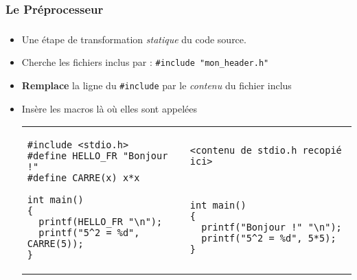\subsubsection{Le Préprocesseur}
\begin{frame}[fragile]
\frametitle{\insertsubsubsection}
\begin{itemize}
  \item Une étape de transformation \textit{statique} du code source.
  \item Cherche les fichiers inclus par : \texttt{\#include "mon\_header.h"}
  \item \textbf{Remplace} la ligne du \texttt{\#include} par le \textit{contenu} du fichier inclus
  \item Insère les macros là où elles sont appelées
\begin{tabular}{p{5cm}p{5cm}}
\begin{lstlisting}
#include <stdio.h>
#define HELLO_FR "Bonjour !"
#define CARRE(x) x*x

int main()
{
  printf(HELLO_FR "\n");
  printf("5^2 = %d", CARRE(5));
}
\end{lstlisting} & 
\begin{lstlisting}
<contenu de stdio.h recopié ici>



int main()
{
  printf("Bonjour !" "\n");
  printf("5^2 = %d", 5*5);
}
\end{lstlisting}
\end{tabular}
\end{itemize}
\end{frame}

